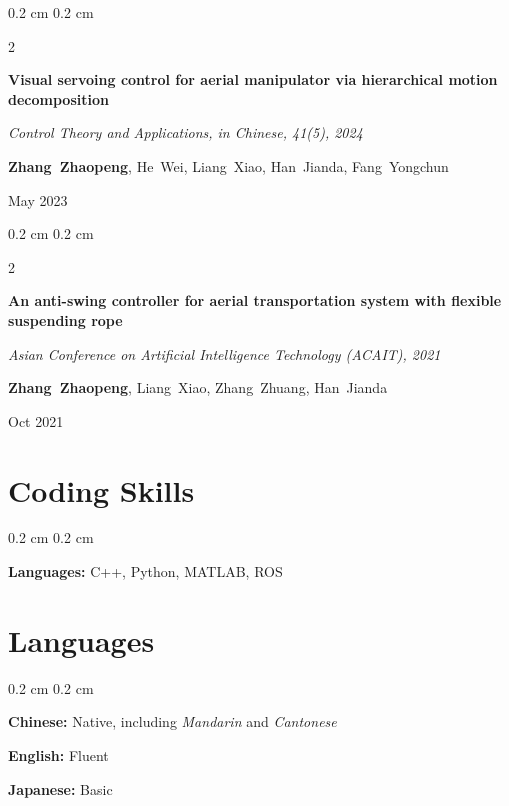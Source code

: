 \documentclass[10pt, letterpaper]{article}
\newenvironment{onecolentry}{
    \begin{adjustwidth}{
        0.2 cm
    }{
        0.2 cm
    }
}{
    \end{adjustwidth}
} %
\newenvironment{twocolentry}[2][]{
    \onecolentry
    \def\secondColumn{#2}
    \setcolumnwidth{\fill, 4.5 cm}
    \begin{paracol}{2}
}{
    \switchcolumn \raggedleft \secondColumn
    \end{paracol}
    \endonecolentry
} %
\begin{document}
\begin{twocolentry}{May 2023}
  \textbf{Visual servoing control for aerial manipulator via hierarchical motion decomposition}
  \vspace{0.10 cm}

  \textit{Control Theory and Applications, in Chinese, 41(5), 2024}
  \vspace{0.10 cm}

  \mbox{\textbf{Zhang Zhaopeng}}, \mbox{He Wei}, \mbox{Liang Xiao}, \mbox{Han Jianda}, \mbox{Fang Yongchun}
\end{twocolentry}
\vspace{0.3 cm}

\begin{twocolentry}{Oct 2021}
  \textbf{An anti-swing controller for aerial transportation system with flexible suspending rope}
  \vspace{0.10 cm}

  \textit{Asian Conference on Artificial Intelligence Technology (ACAIT), 2021}
  \vspace{0.10 cm}

  \mbox{\textbf{Zhang Zhaopeng}}, \mbox{Liang Xiao}, \mbox{Zhang Zhuang}, \mbox{Han Jianda}
\end{twocolentry}

\vspace{0.10 cm}


\section{Coding Skills}

\begin{onecolentry}
  \textbf{Languages:} C++, Python, MATLAB, ROS
\end{onecolentry}

\vspace{0.2 cm}

\section{Languages}

\begin{onecolentry}
  \textbf{Chinese:} Native, including \textit{Mandarin} and \textit{Cantonese}

  \textbf{English:} Fluent
  
  \textbf{Japanese:} Basic
\end{onecolentry}
\end{document}
